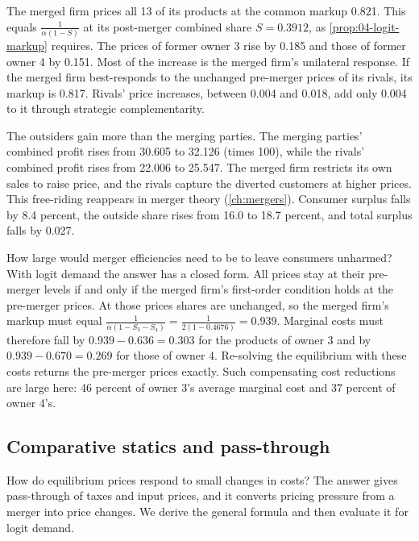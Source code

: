 The merged firm prices all 13 of its products at the common markup 0.821. This equals $\frac{1}{\alpha(1 -
S)}$ at its post-merger combined share $S = 0.3912$, as \cref{prop:04-logit-markup} requires. The prices of
former owner 3 rise by 0.185 and those of former owner 4 by 0.151. Most of the increase is the merged firm's
unilateral response. If the merged firm best-responds to the unchanged pre-merger prices of its rivals, its markup
is 0.817. Rivals' price increases, between 0.004 and 0.018, add only 0.004 to it through strategic
complementarity.

The outsiders gain more than the merging parties. The merging parties' combined profit rises from 30.605 to
32.126 (times 100), while the rivals' combined profit rises from 22.006 to 25.547. The merged firm restricts its
own sales to raise price, and the rivals capture the diverted customers at higher prices. This free-riding
reappears in merger theory (\cref{ch:mergers}). Consumer surplus falls by 8.4 percent, the outside share rises
from 16.0 to 18.7 percent, and total surplus falls by 0.027.

How large would merger efficiencies need to be to leave consumers unharmed? With logit demand the answer has a
closed form. All prices stay at their pre-merger levels if and only if the merged firm's first-order condition
holds at the pre-merger prices. At those prices shares are unchanged, so the merged firm's markup must equal
$\frac{1}{\alpha(1 - S_3 - S_4)} = \frac{1}{2(1 - 0.4676)} = 0.939$. Marginal costs must therefore fall by $0.939
- 0.636 = 0.303$ for the products of owner 3 and by $0.939 - 0.670 = 0.269$ for those of owner 4. Re-solving the
equilibrium with these costs returns the pre-merger prices exactly. Such compensating cost reductions
\citep{Werden1996} are large here: 46 percent of owner 3's average marginal cost and 37 percent of owner 4's.

\subsection{Comparative statics and pass-through}\label{sec:04-comparative}

How do equilibrium prices respond to small changes in costs? The answer gives pass-through of taxes and input
prices, and it converts pricing pressure from a merger into price changes. We derive the general formula and then
evaluate it for logit demand.

